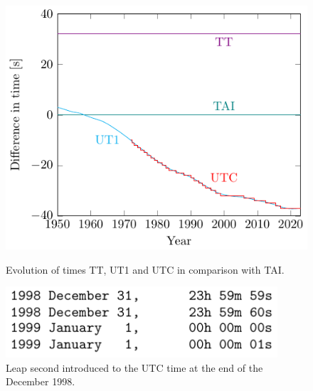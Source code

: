\documentclass[../main.tex]{subfiles}
\begin{document}
\begin{figure}[htbp]
  \centering
  \begin{minipage}[ht]{0.45\textwidth}
    \centering
    \includegraphics[width=\textwidth]{Images/time_graph.pdf}
    \caption{Evolution of times TT, UT1 and UTC in comparison with TAI. \cite{iersDeltaT}}
    \label{fig:time_graph}
  \end{minipage}
  \hfill
  \begin{minipage}[ht]{0.45\textwidth}
    \centering
    \includegraphics[width=0.9\textwidth]{Images/leap_second.pdf}
    \caption{Leap second introduced to the UTC time at the end of the December 1998. \cite{iersbulletinC}}
    \label{fig:leapsecond}
  \end{minipage}
\end{figure}
\end{document}

